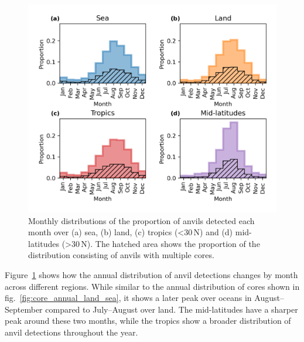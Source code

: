 \begin{figure}[tp]
    \centering
    \includegraphics[width=\textwidth]{figures/chapter2_17.png}
    \caption[
    Monthly distributions of the proportion of anvils detected each month over land, sea, tropics and mid-latitudes
    ]{
    Monthly distributions of the proportion of anvils detected each month over (a) sea, (b) land, (c) tropics (\textless 30\,\textdegree N) and (d) mid-latitudes (\textgreater 30\,\textdegree N). The hatched area shows the proportion of the distribution consisting of anvils with multiple cores.
    }
    \label{fig:anvil_monthly_cycles}
\end{figure}

Figure~\ref{fig:anvil_monthly_cycles} shows how the annual distribution of anvil detections changes by month across different regions.
While similar to the annual distribution of cores shown in fig.~\ref{fig:core_annual_land_sea}, it shows a later peak over oceans in August--September compared to July--August over land.
The mid-latitudes have a sharper peak around these two months, while the tropics show a broader distribution of anvil detections throughout the year.


